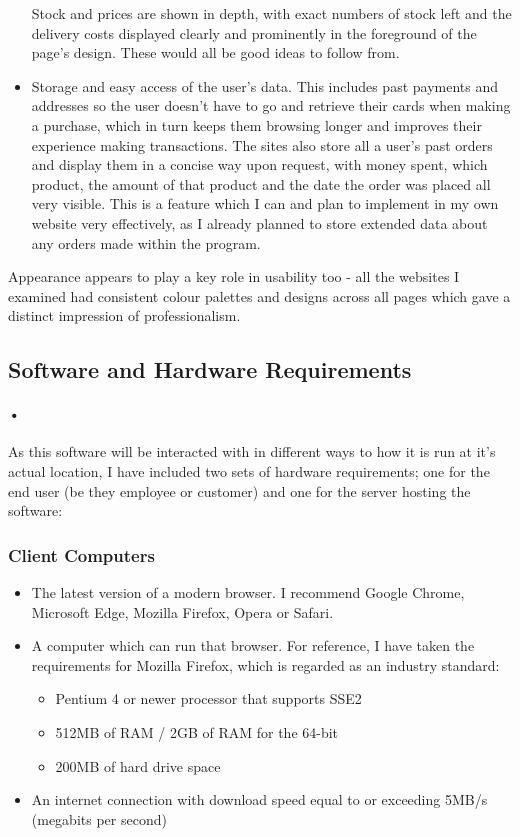 \documentclass{article}
\begin{document}
\begin{itemize}
    Stock and prices are shown in depth, with exact numbers of stock left and the delivery costs displayed clearly and prominently in the foreground of the page's design.
    These would all be good ideas to follow from.
    \item Storage and easy access of the user's data.
    This includes past payments and addresses so the user doesn't have to go and retrieve their cards when making a purchase, which in turn keeps them browsing longer and improves their experience making transactions.
    The sites also store all a user's past orders and display them in a concise way upon request, with money spent, which product, the amount of that product and the date the order was placed all very visible.
    This is a feature which I can and plan to implement in my own website very effectively, as I already planned to store extended data about any orders made within the program.
    \end{itemize}
    Appearance appears to play a key role in usability too - all the websites I examined had consistent colour palettes and designs across all pages which gave a distinct impression of professionalism.
        
    \subsection{Software and Hardware Requirements}
    \paragraph{•}
    As this software will be interacted with in different ways to how it is run at it’s actual location, I have included two sets of hardware requirements; one for the end user (be they employee or customer) and one for the server hosting the software:
    
    \subsubsection{Client Computers}
    \begin{itemize}
    \item The latest version of a modern browser. 
    I recommend Google Chrome, Microsoft Edge, Mozilla Firefox, Opera or Safari.
    \item A computer which can run that browser. For reference, I have taken the requirements for Mozilla Firefox, which is regarded as an industry standard:
    \begin{itemize}
    \item Pentium 4 or newer processor that supports SSE2
    \item 512MB of RAM / 2GB of RAM for the 64-bit 
    \item 200MB of hard drive space
    \end{itemize}
    \item An internet connection with download speed equal to or exceeding 5MB/s (megabits per second)
    \end{itemize}
    
\end{document}

